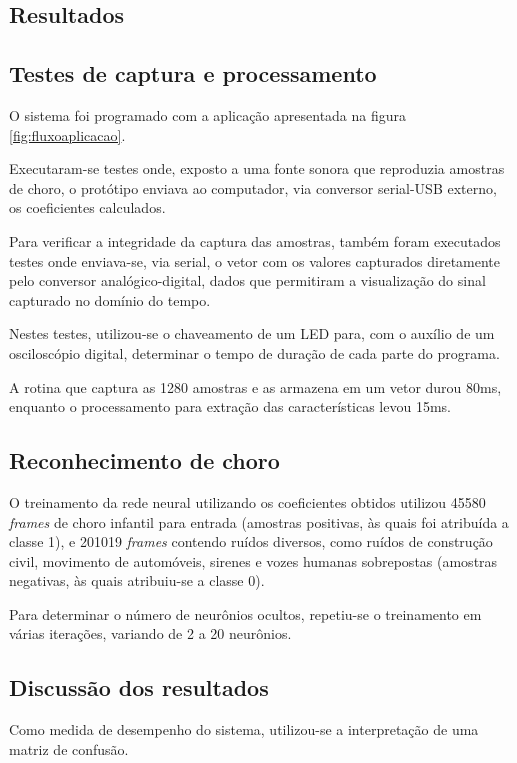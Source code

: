 \documentclass[10pt,a4paper]{article}
\begin{document}
\begin{multicols*}{2}
\section{Resultados}

\subsection{Testes de captura e processamento}

O sistema foi programado com a aplicação apresentada na figura \ref{fig:fluxoaplicacao}.

Executaram-se testes onde, exposto a uma fonte sonora que reproduzia amostras de choro, o protótipo enviava ao computador, via conversor serial-USB externo, os coeficientes calculados.

Para verificar a integridade da captura das amostras, também foram executados testes onde enviava-se, via serial, o vetor com os valores capturados diretamente pelo conversor analógico-digital, dados que permitiram a visualização do sinal capturado no domínio do tempo.

Nestes testes, utilizou-se o chaveamento de um LED para, com o auxílio de um osciloscópio digital, determinar o tempo de duração de cada parte do programa.

A rotina que captura as 1280 amostras e as armazena em um vetor durou 80ms, enquanto o processamento para extração das características levou 15ms.


\subsection{Reconhecimento de choro}

O treinamento da rede neural utilizando os coeficientes obtidos utilizou 45580 \textit{frames} de choro infantil para entrada (amostras positivas, às quais foi atribuída a classe 1), e 201019 \textit{frames} contendo ruídos diversos, como ruídos de construção civil, movimento de automóveis, sirenes e vozes humanas sobrepostas (amostras negativas, às quais atribuiu-se a classe 0).

Para determinar o número de neurônios ocultos, repetiu-se o treinamento em várias iterações, variando de 2 a 20 neurônios.

\subsection{Discussão dos resultados}

Como medida de desempenho do sistema, utilizou-se a interpretação de uma matriz de confusão.


\end{multicols*}
\end{document}
